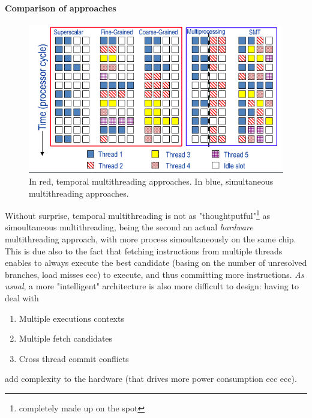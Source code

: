 \documentclass[10pt,a4paper]{article}
\begin{document}
				\paragraph{Comparison of approaches}
					\begin{figure}[H]
						\centering
						\includegraphics[width = \textwidth]{./images/threadLevelParallelism.png}
						\caption{In red, temporal multithreading approaches. In blue, simultaneous multithreading approaches.}
					\end{figure}
					Without surprise, temporal multithreading is not as "thoughtputful"\footnote{completely made up on the spot} as simoultaneous multithreading, being the second an actual \emph{hardware} multithreading approach, with more process simoultaneously on the same chip.\\
					This is due also to the fact that fetching instructions from multiple threads enables to always execute the best candidate (basing on the number of unresolved branches, load misses ecc) to execute, and thus committing more instructions. \emph{As usual}, a more "intelligent" architecture is also more difficult to design: having to deal with
					\begin{enumerate}
						\item Multiple executions contexts
						\item Multiple fetch candidates
						\item Cross thread commit conflicts
					\end{enumerate}
					add complexity to the hardware (that drives more power consumption ecc ecc).
					
\end{document}
